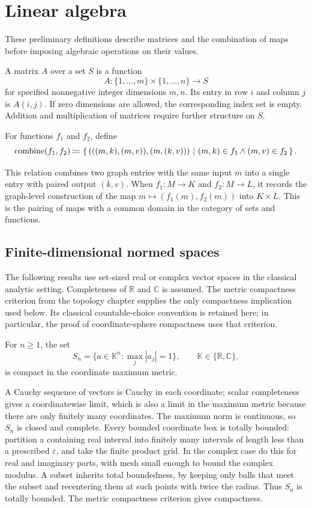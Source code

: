 \def\topic{Linear algebra}

\section{Linear algebra}
These preliminary definitions describe matrices and the combination of
maps before imposing algebraic operations on their values.

\begin{definition}
A matrix $A$ over a set $S$ is a function
\[
A:\{1,\ldots,m\}\times\{1,\ldots,n\}\longrightarrow S
\]
for specified nonnegative integer dimensions $m,n$. Its entry in row $i$ and column $j$ is
$A(i,j)$. If zero dimensions are allowed, the corresponding index set is
empty. Addition and multiplication of matrices require further structure
on $S$.
\end{definition}

\begin{definition}
For functions $f_1$ and $f_2$, define
\[
\mbox{combine}(f_1,f_2)
 \,{\coloneqq}\,\left\{\,(((m,k),(m,v)),(m,(k,v)))\ \middle|\ (m,k)\in f_1\land(m,v)\in f_2\,\right\}.
\]
\end{definition}
This relation combines two graph entries with the same input $m$ into a
single entry with paired output $(k,v)$. When $f_1:M\to K$ and
$f_2:M\to L$, it records the graph-level construction of the map
$m\mapsto(f_1(m),f_2(m))$ into $K\times L$. This is the pairing of maps
with a common domain in the category of sets and functions.

\subsection{Finite-dimensional normed spaces}
The following results use set-sized real or complex vector spaces in the
classical analytic setting. Completeness of $\mathbb R$ and $\mathbb C$
is assumed. The metric compactness criterion from the topology chapter
supplies the only compactness implication used below. Its classical
countable-choice convention is retained here; in particular, the proof
of coordinate-sphere compactness uses that criterion.

\begin{lemma}
For $n\geq1$, the set
\[
S_n=\{a\in\mathbb K^n:\max_j|a_j|=1\},
\qquad \mathbb K\in\{\mathbb R,\mathbb C\},
\]
is compact in the coordinate maximum metric.
\end{lemma}
\Proof
A Cauchy sequence of vectors is Cauchy in each coordinate; scalar
completeness gives a coordinatewise limit, which is also a limit in the
maximum metric because there are only finitely many coordinates.
The maximum norm is continuous, so $S_n$ is closed and complete.
Every bounded coordinate box is totally bounded: partition a containing
real interval into finitely many intervals of length less than a prescribed
$\varepsilon$, and take the finite product grid. In the complex case do
this for real and imaginary parts, with mesh small enough to bound the
complex modulus. A subset inherits total boundedness, by keeping only
balls that meet the subset and recentering them at such points with
twice the radius. Thus $S_n$ is totally bounded. The metric compactness
criterion gives compactness.
\Done

